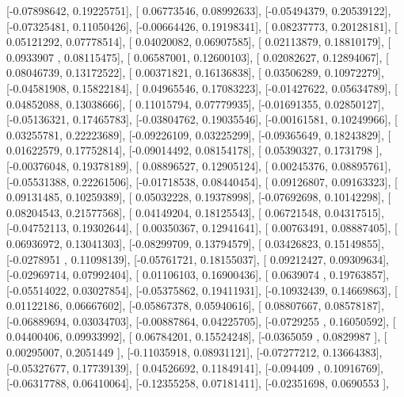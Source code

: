 \documentclass{article}
\begin{document}
       [-0.07898642,  0.19225751],
       [ 0.06773546,  0.08992633],
       [-0.05494379,  0.20539122],
       [-0.07325481,  0.11050426],
       [-0.00664426,  0.19198341],
       [ 0.08237773,  0.20128181],
       [ 0.05121292,  0.07778514],
       [ 0.04020082,  0.06907585],
       [ 0.02113879,  0.18810179],
       [ 0.0933907 ,  0.08115475],
       [ 0.06587001,  0.12600103],
       [ 0.02082627,  0.12894067],
       [ 0.08046739,  0.13172522],
       [ 0.00371821,  0.16136838],
       [ 0.03506289,  0.10972279],
       [-0.04581908,  0.15822184],
       [ 0.04965546,  0.17083223],
       [-0.01427622,  0.05634789],
       [ 0.04852088,  0.13038666],
       [ 0.11015794,  0.07779935],
       [-0.01691355,  0.02850127],
       [-0.05136321,  0.17465783],
       [-0.03804762,  0.19035546],
       [-0.00161581,  0.10249966],
       [ 0.03255781,  0.22223689],
       [-0.09226109,  0.03225299],
       [-0.09365649,  0.18243829],
       [ 0.01622579,  0.17752814],
       [-0.09014492,  0.08154178],
       [ 0.05390327,  0.1731798 ],
       [-0.00376048,  0.19378189],
       [ 0.08896527,  0.12905124],
       [ 0.00245376,  0.08895761],
       [-0.05531388,  0.22261506],
       [-0.01718538,  0.08440454],
       [ 0.09126807,  0.09163323],
       [ 0.09131485,  0.10259389],
       [ 0.05032228,  0.19378998],
       [-0.07692698,  0.10142298],
       [ 0.08204543,  0.21577568],
       [ 0.04149204,  0.18125543],
       [ 0.06721548,  0.04317515],
       [-0.04752113,  0.19302644],
       [ 0.00350367,  0.12941641],
       [ 0.00763491,  0.08887405],
       [ 0.06936972,  0.13041303],
       [-0.08299709,  0.13794579],
       [ 0.03426823,  0.15149855],
       [-0.0278951 ,  0.11098139],
       [-0.05761721,  0.18155037],
       [ 0.09212427,  0.09309634],
       [-0.02969714,  0.07992404],
       [ 0.01106103,  0.16900436],
       [ 0.0639074 ,  0.19763857],
       [-0.05514022,  0.03027854],
       [-0.05375862,  0.19411931],
       [-0.10932439,  0.14669863],
       [ 0.01122186,  0.06667602],
       [-0.05867378,  0.05940616],
       [ 0.08807667,  0.08578187],
       [-0.06889694,  0.03034703],
       [-0.00887864,  0.04225705],
       [-0.0729255 ,  0.16050592],
       [ 0.04400406,  0.09933992],
       [ 0.06784201,  0.15524248],
       [-0.0365059 ,  0.0829987 ],
       [ 0.00295007,  0.2051449 ],
       [-0.11035918,  0.08931121],
       [-0.07277212,  0.13664383],
       [-0.05327677,  0.17739139],
       [ 0.04526692,  0.11849141],
       [-0.094409  ,  0.10916769],
       [-0.06317788,  0.06410064],
       [-0.12355258,  0.07181411],
       [-0.02351698,  0.0690553 ],
\end{document}
